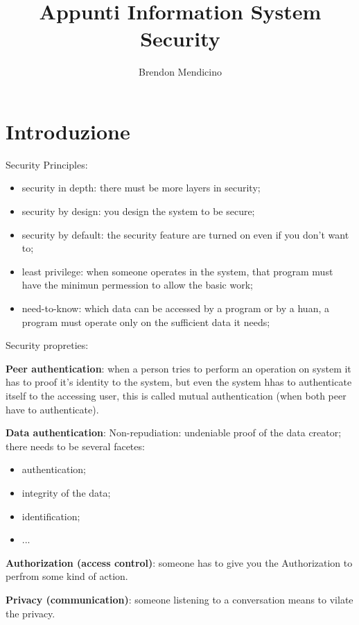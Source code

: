 \documentclass[12pt]{article}
\title{Appunti Information System Security}
\author{Brendon Mendicino}
\begin{document}
\maketitle
\newpage
\tableofcontents
\newpage


\section{Introduzione}\label{sec:introduzione}




Security Principles:
\begin{itemize}
    \item security in depth: there must be more layers in security;
    \item security by design: you design the system to be secure;
    \item security by default: the security feature are turned on even if you don't want to;
    \item least privilege: when someone operates in the system, that program must have the minimun permession to allow the basic work;
    \item need-to-know: which data can be accessed by a program or by a huan, a program must operate only on the sufficient data it needs;
\end{itemize}


Security propreties:

\textbf{Peer authentication}: when a person tries to perform an operation on system it has to proof it's identity to the system, but even the system hhas to authenticate itself to the accessing user, this is called mutual authentication (when both peer have to authenticate).

\textbf{Data authentication}: Non-repudiation: undeniable proof of the data creator; there needs to be several facetes:
\begin{itemize}
    \item authentication;
    \item integrity of the data;
    \item identification;
    \item ...
\end{itemize}

\textbf{Authorization (access control)}: someone has to give you the Authorization to perfrom some kind of action.

\textbf{Privacy (communication)}: someone listening to a conversation means to vilate the privacy.
\end{document}
